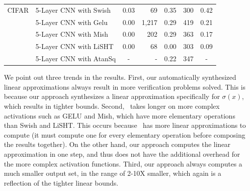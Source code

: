 \begin{table}[t]
{\begin{tabular}{|ll|cr|cr|c|}
			\multicolumn{1}{|l|}{CIFAR} & 5-Layer CNN with
			Swish                                     &
			\multicolumn{1}{c|}{0.03}         & 69       &
			\multicolumn{1}{c|}{0.35}         & 300                           &
			0.42                                              \\ \cline{2-7}
			\multicolumn{1}{|l|}{}      & 5-Layer CNN with
			Gelu                                      &
			\multicolumn{1}{c|}{0.00}         & 1,217    &
			\multicolumn{1}{c|}{0.29}          & 419                           &
			0.21                                              \\ \cline{2-7}
			\multicolumn{1}{|l|}{}      & 5-Layer CNN with
			Mish                                      &
			\multicolumn{1}{c|}{0.00}         & 202      &
			\multicolumn{1}{c|}{0.29}         & 363                           &
			0.17                                              \\ \cline{2-7}
			\multicolumn{1}{|l|}{}      & 5-Layer CNN with
			LiSHT                                     &
			\multicolumn{1}{c|}{0.00}         & 68       &
			\multicolumn{1}{c|}{0.00}          & 303                           &
			0.09                                              \\ \cline{2-7}
			\multicolumn{1}{|l|}{}      & 5-Layer CNN with
			AtanSq\footnotemark[1]{}                                    &
			\multicolumn{1}{c|}{-}            & -        &
			\multicolumn{1}{c|}{0.22}          & 347                           &
			-                                                 \\ \hline
		\end{tabular}
	}

\end{table}


We point out three trends in the results. First, our automatically synthesized
linear approximations always result in more verification problems solved. This
is because our approach synthesizes a linear approximation specifically for $
\sigma(x) $, which results in tighter bounds. Second,~\autolipra{} takes longer
on more complex activations such as GELU and Mish, which have more elementary
operations than Swish and LiSHT. This occurs because~\autolipra{} has more
linear approximations to compute (it must compute one for every elementary
operation before composing the results together). On the other hand, our
approach computes the linear approximation in one step, and thus does not have
the additional overhead for the more complex activation functions. Third, our
approach always computes a much smaller output set, in the range of 2-10X
smaller, which again is a reflection of the tighter linear bounds.

